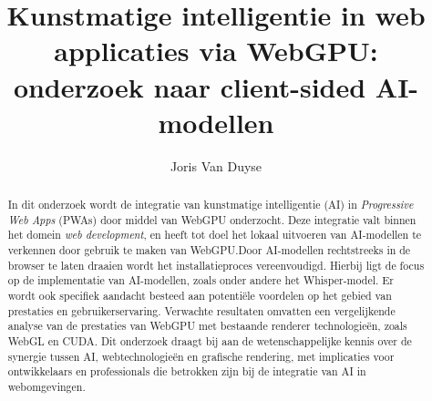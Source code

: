 \documentclass{hogent-article}
\title{Kunstmatige intelligentie in web applicaties via WebGPU: onderzoek naar client-sided AI-modellen}
\author{Joris Van Duyse}
\begin{document}
\begin{abstract}

In dit onderzoek wordt de integratie van kunstmatige intelligentie (AI) in \textit{Progressive Web Apps} (PWAs) door middel van WebGPU onderzocht. Deze integratie valt binnen het domein \textit{web development}, en heeft tot doel het lokaal uitvoeren van AI-modellen te verkennen door gebruik te maken van WebGPU.\@ Door AI-modellen rechtstreeks in de browser te laten draaien wordt het installatieproces vereenvoudigd. Hierbij ligt de focus op de implementatie van AI-modellen, zoals onder andere het Whisper-model. Er wordt ook specifiek aandacht besteed aan potentiële voordelen op het gebied van prestaties en gebruikerservaring. Verwachte resultaten omvatten een vergelijkende analyse van de prestaties van WebGPU met bestaande renderer technologieën, zoals WebGL en CUDA. Dit onderzoek draagt bij aan de wetenschappelijke kennis over de synergie tussen AI, webtechnologieën en grafische rendering, met implicaties voor ontwikkelaars en professionals die betrokken zijn bij de integratie van AI in webomgevingen.
\end{abstract}

\tableofcontents



\printbibliography[heading=bibintoc]

\clearpage
\end{document}
